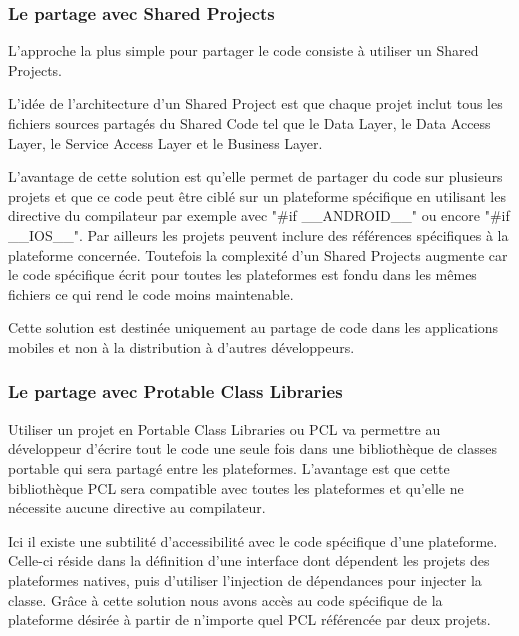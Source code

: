 \documentclass[11]{article}
\begin{document}
\subsubsection{Le partage avec Shared Projects}
L'approche la plus simple pour partager le code consiste à utiliser un Shared Projects.
 
 \vspace{0.5cm}
 
L’idée de l'architecture d’un Shared Project est que chaque projet inclut tous les fichiers sources partagés du Shared Code tel que le Data Layer, le Data Access Layer, le Service Access Layer et le Business Layer.
 
 \vspace{0.5cm}
 
L’avantage de cette solution est qu’elle permet de partager du code sur plusieurs projets et que ce code peut être ciblé sur un plateforme spécifique en utilisant les directive du compilateur par exemple avec "\#if \_\_ANDROID\_\_" ou encore "\#if \_\_IOS\_\_". Par ailleurs les projets peuvent inclure des références spécifiques à la plateforme concernée. Toutefois la complexité d’un Shared Projects augmente car le code spécifique écrit pour toutes les plateformes est fondu dans les mêmes fichiers ce qui rend le code moins maintenable.
 
 \vspace{0.5cm}
 
Cette solution est destinée uniquement au partage de code dans les applications mobiles et non à la distribution à d'autres développeurs.


\subsubsection{Le partage avec Protable Class Libraries}
Utiliser un projet en Portable Class Libraries ou PCL va permettre au développeur d’écrire tout le code une seule fois dans une bibliothèque de classes portable qui sera partagé entre les plateformes. L’avantage est que cette bibliothèque PCL sera compatible avec toutes les plateformes et qu’elle ne nécessite aucune directive au compilateur.
  
 \vspace{0.5cm}
 
Ici il existe une subtilité d'accessibilité avec le code spécifique d’une plateforme. Celle-ci réside dans la définition d’une interface dont dépendent les projets des plateformes natives, puis d’utiliser l’injection de dépendances pour injecter la classe. Grâce à cette solution nous avons accès au code spécifique de la plateforme désirée à partir de n’importe quel PCL référencée par deux projets. 
\end{document}
